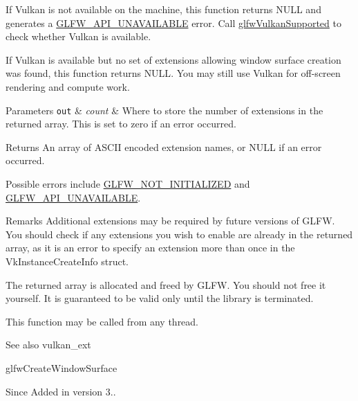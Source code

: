 If Vulkan is not available on the machine, this function returns {\ttfamily N\+U\+LL} and generates a \hyperlink{group__errors_ga56882b290db23261cc6c053c40c2d08e}{G\+L\+F\+W\+\_\+\+A\+P\+I\+\_\+\+U\+N\+A\+V\+A\+I\+L\+A\+B\+LE} error. Call \hyperlink{group__vulkan_ga72e7c3757d9ff2333181a5569bb7c403}{glfw\+Vulkan\+Supported} to check whether Vulkan is available.

If Vulkan is available but no set of extensions allowing window surface creation was found, this function returns {\ttfamily N\+U\+LL}. You may still use Vulkan for off-\/screen rendering and compute work.


\begin{DoxyParams}[1]{Parameters}
\mbox{\tt out}  & {\em count} & Where to store the number of extensions in the returned array. This is set to zero if an error occurred. \\
\hline
\end{DoxyParams}
\begin{DoxyReturn}{Returns}
An array of A\+S\+C\+II encoded extension names, or {\ttfamily N\+U\+LL} if an error occurred.
\end{DoxyReturn}
Possible errors include \hyperlink{group__errors_ga2374ee02c177f12e1fa76ff3ed15e14a}{G\+L\+F\+W\+\_\+\+N\+O\+T\+\_\+\+I\+N\+I\+T\+I\+A\+L\+I\+Z\+ED} and \hyperlink{group__errors_ga56882b290db23261cc6c053c40c2d08e}{G\+L\+F\+W\+\_\+\+A\+P\+I\+\_\+\+U\+N\+A\+V\+A\+I\+L\+A\+B\+LE}.

\begin{DoxyRemark}{Remarks}
Additional extensions may be required by future versions of G\+L\+FW. You should check if any extensions you wish to enable are already in the returned array, as it is an error to specify an extension more than once in the {\ttfamily Vk\+Instance\+Create\+Info} struct.
\end{DoxyRemark}
The returned array is allocated and freed by G\+L\+FW. You should not free it yourself. It is guaranteed to be valid only until the library is terminated.

This function may be called from any thread.

\begin{DoxySeeAlso}{See also}
vulkan\+\_\+ext 

glfw\+Create\+Window\+Surface
\end{DoxySeeAlso}
\begin{DoxySince}{Since}
Added in version 3.. 
\end{DoxySince}
\mbox{\label{group__vulkan_ga72e7c3757d9ff2333181a5569bb7c403}} 
